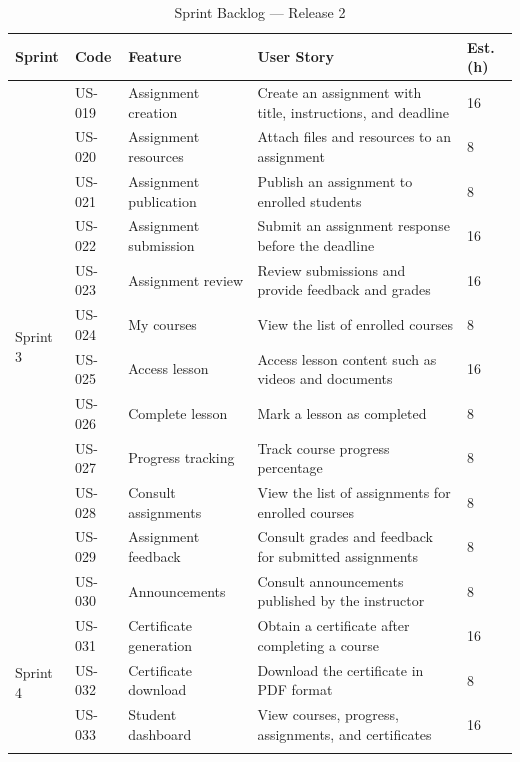 \begin{table}[H]
\centering
\caption{Sprint Backlog — Release 2}
\label{tab:backlog_r2}
\renewcommand{\arraystretch}{1.25}
\footnotesize
\begin{tabularx}{\textwidth}{|p{1.4cm}|p{1.5cm}|p{2.8cm}|p{6.8cm}|p{1.5cm}|}
\hline
\textbf{Sprint} & \textbf{Code} & \textbf{Feature} & \textbf{User Story} & \textbf{Est. (h)} \\
\hline
\multirow{12}{*}{Sprint 3}
  & US-019 & Assignment creation & Create an assignment with title, instructions, and deadline & 16 \\
  \cline{2-5}
  & US-020 & Assignment resources & Attach files and resources to an assignment & 8 \\
  \cline{2-5}
  & US-021 & Assignment publication & Publish an assignment to enrolled students & 8 \\
  \cline{2-5}
  & US-022 & Assignment submission & Submit an assignment response before the deadline & 16 \\
  \cline{2-5}
  & US-023 & Assignment review & Review submissions and provide feedback and grades & 16 \\
  \cline{2-5}
  & US-024 & My courses & View the list of enrolled courses & 8 \\
  \cline{2-5}
  & US-025 & Access lesson & Access lesson content such as videos and documents & 16 \\
  \cline{2-5}
  & US-026 & Complete lesson & Mark a lesson as completed & 8 \\
  \cline{2-5}
  & US-027 & Progress tracking & Track course progress percentage & 8 \\
  \cline{2-5}
  & US-028 & Consult assignments & View the list of assignments for enrolled courses & 8 \\
  \cline{2-5}
  & US-029 & Assignment feedback & Consult grades and feedback for submitted assignments & 8 \\
  \cline{2-5}
  & US-030 & Announcements & Consult announcements published by the instructor & 8 \\
\hline
\multirow{11}{*}{Sprint 4}
  & US-031 & Certificate generation & Obtain a certificate after completing a course & 16 \\
  \cline{2-5}
  & US-032 & Certificate download & Download the certificate in PDF format & 8 \\
  \cline{2-5}
  & US-033 & Student dashboard & View courses, progress, assignments, and certificates & 16 \\
  \cline{2-5}

\end{tabularx}
\end{table}

